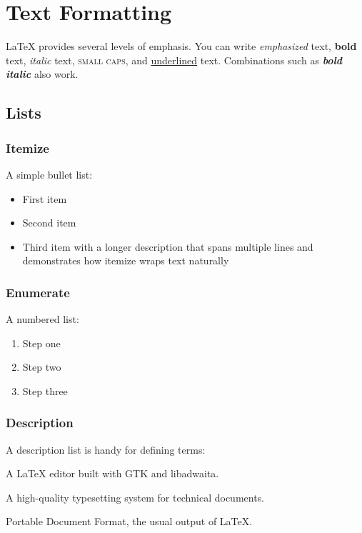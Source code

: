 \documentclass[11pt]{article}
\theoremstyle{definition}
\theoremstyle{plain}
\begin{document}
\section{Text Formatting}
\label{sec:text}

\LaTeX{} provides several levels of emphasis.
You can write \emph{emphasized} text, \textbf{bold} text,
\textit{italic} text, \textsc{small caps}, and \underline{underlined}
text.
Combinations such as \textbf{\emph{bold italic}} also work.

\subsection{Lists}

\subsubsection{Itemize}
\label{sec:text:lists:itemize}

A simple bullet list:

\begin{itemize}[noitemsep]
    \item First item
    \item Second item
    \item Third item with a longer description that spans multiple lines
          and demonstrates how itemize wraps text naturally
\end{itemize}

\subsubsection{Enumerate}
\label{sec:text:lists:enumerate}

A numbered list:

\begin{enumerate}[noitemsep]
    \item Step one
    \item Step two
    \item Step three
\end{enumerate}

\subsubsection{Description}
\label{sec:text:lists:description}

A description list is handy for defining terms:

\begin{description}[noitemsep]
    \item[Setzer] A \LaTeX{} editor built with GTK and libadwaita.
    \item[\LaTeX] A high-quality typesetting system for technical documents.
    \item[PDF] Portable Document Format, the usual output of \LaTeX{}.
\end{description}
\end{document}
